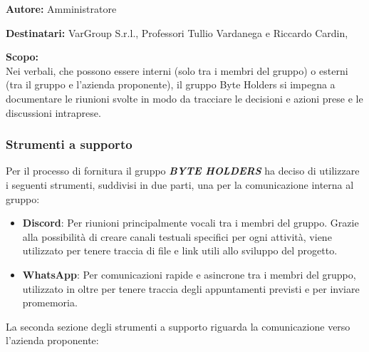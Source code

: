 \documentclass[a4paper, 11pt]{article}
\begin{document}

\begin{tcolorbox}[
    colback=LightGray,       %
    colframe=AccentColor,    %
    coltitle=white,          %
    fonttitle=\bfseries\large,
    boxrule=0.5mm,           %
    arc=2mm,                 %
    title={Verbali} %
]
    \textbf{\textcolor{AccentDark}{Autore:}} Amministratore  %
    
    \vspace{0.2cm} %
    \textbf{\textcolor{AccentDark}{Destinatari:}} VarGroup S.r.l., Professori Tullio Vardanega e Riccardo Cardin, 

    \vspace{0.2cm} %

    \textbf{\textcolor{AccentDark}{Scopo:}} \\
    Nei verbali, che possono essere interni (solo tra i membri del gruppo) o esterni (tra il gruppo e l'azienda proponente), il gruppo Byte Holders si impegna a documentare le riunioni svolte in modo da tracciare le decisioni e azioni prese e le discussioni intraprese.

\end{tcolorbox}

\subsubsection{Strumenti a supporto}
Per il processo di fornitura il gruppo \textbf{\textit{BYTE HOLDERS}} ha deciso di utilizzare i seguenti strumenti, suddivisi in due parti, una per la comunicazione interna al gruppo:
\begin{itemize}
  \item \textbf{Discord}: Per riunioni principalmente vocali tra i membri del gruppo. Grazie alla possibilità di creare canali testuali specifici per ogni attività, viene utilizzato per tenere traccia di file e link utili allo sviluppo del progetto.
  \item \textbf{WhatsApp}: Per comunicazioni rapide e asincrone tra i membri del gruppo, utilizzato in oltre per tenere traccia degli appuntamenti previsti e per inviare promemoria.
\end{itemize}

La seconda sezione degli strumenti a supporto riguarda la comunicazione verso l'azienda proponente:
\end{document}
